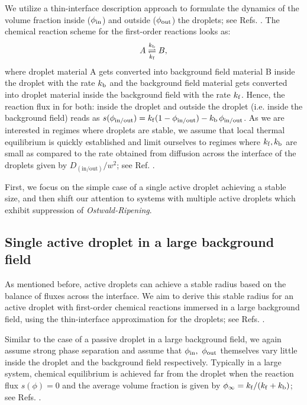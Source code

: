 We utilize a thin-interface description approach to formulate the dynamics of the volume fraction inside ($\phi_\mathrm{in}$) and outside ($\phi_\mathrm{out}$) the droplets; see Refs. \cite{Zwicker2015,Review2019}.
The chemical reaction scheme for the first-order reactions looks as:
\begin{equation}
\label{eqn:reaction_scheme}
    A \underset{k_\mathrm{f}}{\stackrel{k_\mathrm{b}}{\rightleftharpoons}} B,
\end{equation}
where droplet material A gets converted into background field material B inside the droplet with the rate $k_\mathrm{b}$ and the background field material gets converted into droplet material inside the background field with the rate $k_\mathrm{f}$.
Hence, the reaction flux in  for both: inside the droplet and outside the droplet (i.e. inside the background field) reads as $s(\phi_\mathrm{in/out}) = k_\mathrm{f} (1 - \phi_\mathrm{in/out}) - k_\mathrm{b} \, \phi_\mathrm{in/out}$.
As we are interested in regimes where droplets are stable, we assume that local thermal equilibrium is quickly established and limit ourselves to regimes where $k_\mathrm{f}, k_\mathrm{b}$ are small as compared to the rate obtained from diffusion across the interface of the droplets given by $D_\mathrm{(in/out)} / w^2$; see Ref. \cite{Zwicker2015}.

First, we focus on the simple case of a single active droplet achieving a stable size, and then shift our attention to systems with multiple active droplets which exhibit suppression of \textit{Ostwald-Ripening}.

\subsection{Single active droplet in a large background field}
As mentioned before, active droplets can achieve a stable radius based on the balance of fluxes across the interface.
We aim to derive this stable radius for an active droplet with first-order chemical reactions immersed in a large background field, using the thin-interface approximation for the droplets; see Refs. \cite{Zwicker2015,Review2019}.

Similar to the case of a passive droplet in a large background field, we again assume strong phase separation and assume that $\phi_\mathrm{in},~\phi_\mathrm{out}$ themselves vary little inside the droplet and the background field respectively.
Typically in a large system, chemical equilibrium is achieved far from the droplet when the reaction flux $s(\phi)=0$ and the average volume fraction is given by $\phi_\infty = k_\mathrm{f}/(k_\mathrm{f} + k_\mathrm{b})$; see Refs. \cite{Zwicker2015,Review2019}.

